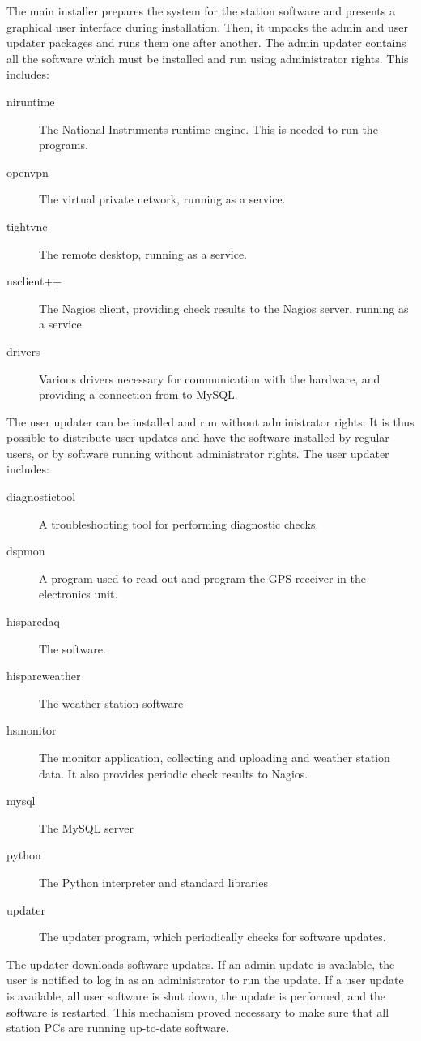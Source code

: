 The main installer prepares the system for the station software and presents a
graphical user interface during installation.  Then, it unpacks the admin and
user updater packages and runs them one after another.  The admin updater
contains all the software which must be installed and run using administrator
rights.  This includes:
\begin{description}
\item[niruntime]  The National Instruments \labview runtime engine.  This is
needed to run the \daq programs.
\item[openvpn]  The virtual private network, running as a service.
\item[tightvnc] The remote desktop, running as a service.
\item[nsclient++] The Nagios client, providing check results to the Nagios
server, running as a service.
\item[drivers] Various drivers necessary for communication with the hardware,
and providing a connection from \labview to MySQL.
\end{description}
%
The user updater can be installed and run without administrator rights.  It is
thus possible to distribute user updates and have the software installed by
regular users, or by software running without administrator rights.  The user
updater includes:
\begin{description}
\item[diagnostictool]  A troubleshooting tool for performing diagnostic checks.
\item[dspmon]  A program used to read out and program the GPS receiver in the
\hisparc electronics unit.
\item[hisparcdaq]  The \hisparc \daq software.
\item[hisparcweather]  The weather station \daq software
\item[hsmonitor]  The \hisparc monitor application, collecting and uploading
\hisparc and weather station data.  It also provides periodic check results to
Nagios.
\item[mysql]  The MySQL server
\item[python]  The Python interpreter and standard libraries
\item[updater]  The updater program, which periodically checks for software
updates.
\end{description}
%
The updater downloads software updates.  If an admin update is available, the
user is notified to log in as an administrator to run the update.  If a user
update is available, all user software is shut down, the update is performed,
and the software is restarted.  This mechanism proved necessary to make sure
that all station PCs are running up-to-date software.


